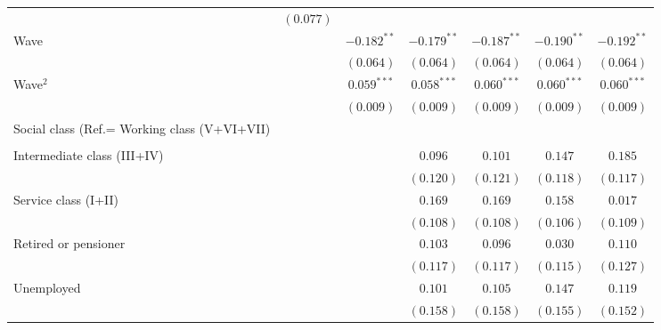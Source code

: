 \documentclass[
  12pt,
]{article}
\begin{document}
\begin{table}
{\begin{center}
{\begin{tabular}{l c c c c c c}
                                             & $(0.077)$      &               &               &               &               &               \\
Wave                                         &                & $-0.182^{**}$ & $-0.179^{**}$ & $-0.187^{**}$ & $-0.190^{**}$ & $-0.192^{**}$ \\
                                             &                & $(0.064)$     & $(0.064)$     & $(0.064)$     & $(0.064)$     & $(0.064)$     \\
Wave$^2$                                     &                & $0.059^{***}$ & $0.058^{***}$ & $0.060^{***}$ & $0.060^{***}$ & $0.060^{***}$ \\
                                             &                & $(0.009)$     & $(0.009)$     & $(0.009)$     & $(0.009)$     & $(0.009)$     \\
Social class (Ref.= Working class (V+VI+VII) &                &               &               &               &               &               \\
                                             &                &               &               &               &               &               \\
\quad Intermediate class (III+IV)            &                &               & $0.096$       & $0.101$       & $0.147$       & $0.185$       \\
                                             &                &               & $(0.120)$     & $(0.121)$     & $(0.118)$     & $(0.117)$     \\
\quad Service class (I+II)                   &                &               & $0.169$       & $0.169$       & $0.158$       & $0.017$       \\
                                             &                &               & $(0.108)$     & $(0.108)$     & $(0.106)$     & $(0.109)$     \\
\quad Retired or pensioner                   &                &               & $0.103$       & $0.096$       & $0.030$       & $0.110$       \\
                                             &                &               & $(0.117)$     & $(0.117)$     & $(0.115)$     & $(0.127)$     \\
\quad Unemployed                             &                &               & $0.101$       & $0.105$       & $0.147$       & $0.119$       \\
                                             &                &               & $(0.158)$     & $(0.158)$     & $(0.155)$     & $(0.152)$     \\

\end{tabular}}
\end{center}}
\end{table}
\end{document}
